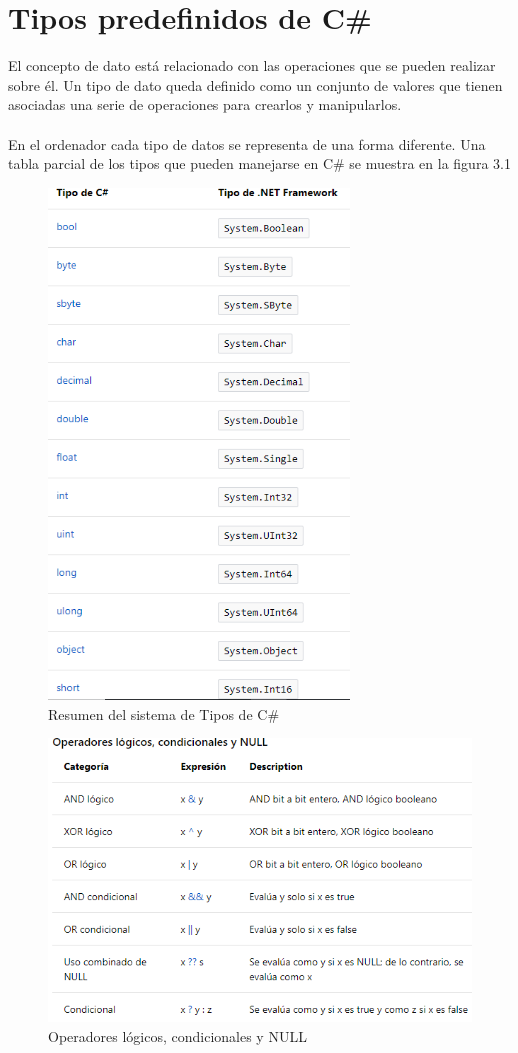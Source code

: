 \documentclass[12pt,a4paper]{report}
\begin{document}
\section{Tipos predefinidos de C\#}
El concepto de dato está relacionado con las operaciones que se pueden realizar sobre él. Un tipo de dato queda definido como un conjunto de valores que tienen asociadas una serie de operaciones para crearlos y manipularlos.\\\\En el ordenador cada tipo de datos se representa de una forma diferente. Una tabla parcial de los tipos que pueden manejarse en C\# se muestra en la figura 3.1
\begin{figure}[hbtp]
\centering
\includegraphics[width=8cm]{Csh_Imagenes/Tabla_Tipos.PNG}
\caption{Resumen del sistema de Tipos de C\#}
\end{figure}
\begin{figure}[hbtp]
\centering
\includegraphics[width=16cm]{Csh_Imagenes/op_condicionales.PNG}
\caption{Operadores lógicos, condicionales y NULL}
\end{figure}
\end{document}
